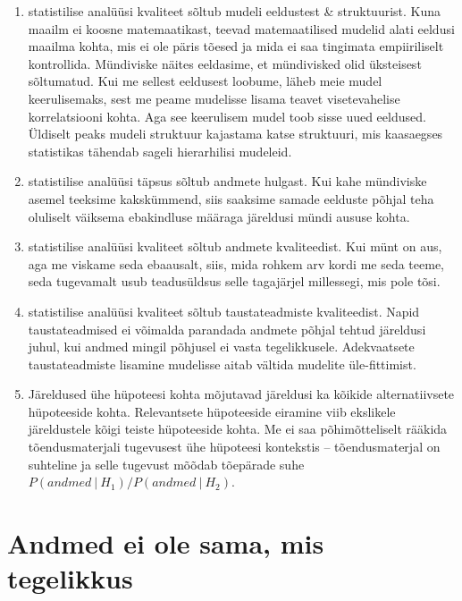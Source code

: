 \documentclass[]{book}
\begin{document}
\begin{enumerate}
\def\labelenumi{\arabic{enumi}.}
\item
  statistilise analüüsi kvaliteet sõltub mudeli eeldustest \&
  struktuurist. Kuna maailm ei koosne matemaatikast, teevad
  matemaatilised mudelid alati eeldusi maailma kohta, mis ei ole päris
  tõesed ja mida ei saa tingimata empiiriliselt kontrollida. Mündiviske
  näites eeldasime, et mündivisked olid üksteisest sõltumatud. Kui me
  sellest eeldusest loobume, läheb meie mudel keerulisemaks, sest me
  peame mudelisse lisama teavet visetevahelise korrelatsiooni kohta. Aga
  see keerulisem mudel toob sisse uued eeldused. Üldiselt peaks mudeli
  struktuur kajastama katse struktuuri, mis kaasaegses statistikas
  tähendab sageli hierarhilisi mudeleid.
\item
  statistilise analüüsi täpsus sõltub andmete hulgast. Kui kahe
  mündiviske asemel teeksime kakskümmend, siis saaksime samade eelduste
  põhjal teha oluliselt väiksema ebakindluse määraga järeldusi mündi
  aususe kohta.
\item
  statistilise analüüsi kvaliteet sõltub andmete kvaliteedist. Kui münt
  on aus, aga me viskame seda ebaausalt, siis, mida rohkem arv kordi me
  seda teeme, seda tugevamalt usub teadusüldsus selle tagajärjel
  millessegi, mis pole tõsi.
\item
  statistilise analüüsi kvaliteet sõltub taustateadmiste kvaliteedist.
  Napid taustateadmised ei võimalda parandada andmete põhjal tehtud
  järeldusi juhul, kui andmed mingil põhjusel ei vasta tegelikkusele.
  Adekvaatsete taustateadmiste lisamine mudelisse aitab vältida mudelite
  üle-fittimist.
\item
  Järeldused ühe hüpoteesi kohta mõjutavad järeldusi ka kõikide
  alternatiivsete hüpoteeside kohta. Relevantsete hüpoteeside eiramine
  viib ekslikele järeldustele kõigi teiste hüpoteeside kohta. Me ei saa
  põhimõtteliselt rääkida tõendusmaterjali tugevusest ühe hüpoteesi
  kontekstis -- tõendusmaterjal on suhteline ja selle tugevust mõõdab
  tõepärade suhe \(P(andmed~\vert~ H_1)/P(andmed ~ \vert ~H_2)\).
\end{enumerate}

\section*{Andmed ei ole sama, mis
tegelikkus}\label{andmed-ei-ole-sama-mis-tegelikkus}
\end{document}
